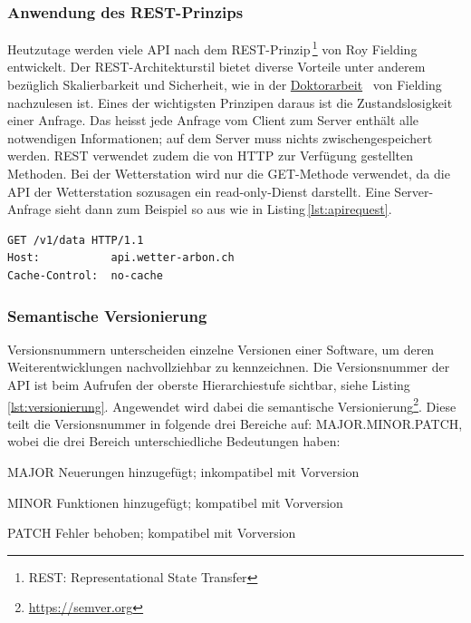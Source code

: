 

\subsubsection{Anwendung des REST-Prinzips}
Heutzutage werden viele API nach dem REST-Prinzip\,\footnote{REST: Representational State Transfer} von Roy Fielding entwickelt. Der REST-Architekturstil bietet diverse Vorteile unter anderem bezüglich Skalierbarkeit und Sicherheit, wie in der \href{https://www.ics.uci.edu/~fielding/pubs/dissertation/top.htm}{Doktorarbeit}~\cite{Fielding:2000:ASD:932295} von Fielding nachzulesen ist. Eines der wichtigsten Prinzipen daraus ist die Zustandslosigkeit einer Anfrage. Das heisst jede Anfrage vom Client zum Server enthält alle notwendigen Informationen; auf dem Server muss nichts zwischengespeichert werden. REST verwendet zudem die von HTTP zur Verfügung gestellten Methoden\cite{LornaJaneMitchell2013oreilly}. Bei der Wetterstation wird nur die GET-Methode verwendet, da die API der Wetterstation sozusagen ein read-only-Dienst darstellt. Eine Server-Anfrage sieht dann zum Beispiel so aus wie in Listing\,\ref{lst:apirequest}.

\vspace{3mm}
\begin{lstlisting}[label=lst:apirequest,caption=RESTful-Serveranfrage, language=HTML5, style=php]
GET /v1/data HTTP/1.1
Host:           api.wetter-arbon.ch
Cache-Control:  no-cache
\end{lstlisting}
\vspace{3mm}


\subsubsection{Semantische Versionierung}
Versionsnummern unterscheiden einzelne Versionen einer Software, um deren Weiterentwicklungen nachvollziehbar zu kennzeichnen. Die Versionsnummer der API ist beim Aufrufen der oberste Hierarchiestufe sichtbar, siehe Listing\,\ref{lst:versionierung}. Angewendet wird dabei die semantische Versionierung\footnote{\url{https://semver.org}}. Diese teilt die Versionsnummer in folgende drei Bereiche auf: MAJOR.MINOR.PATCH, wobei die drei Bereich unterschiedliche Bedeutungen haben:

\begin{description*}
  \item[MAJOR] Neuerungen hinzugefügt; inkompatibel mit Vorversion
  \item[MINOR] Funktionen hinzugefügt; kompatibel mit Vorversion
  \item[PATCH] Fehler behoben; kompatibel mit Vorversion
\end{description*}

